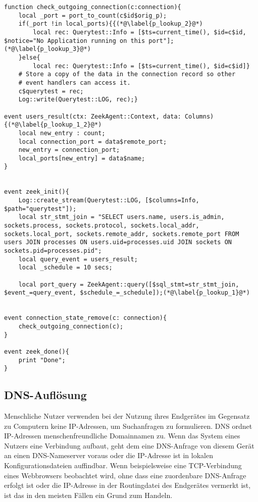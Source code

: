 \begin{lstlisting}[caption={Abfrage und Abgleich der Ports },label={Code_4},consecutivenumbers=false,lastline=77,firstnumber=52,numberblanklines=false,linerange={52-55,62-70,76-77}]
function check_outgoing_connection(c:connection){
    local _port = port_to_count(c$id$orig_p);
    if(_port !in local_ports){{(*@\label{p_lookup_2}@*)
        local rec: Querytest::Info = [$ts=current_time(), $id=c$id, $notice="No Application running on this port"]; (*@\label{p_lookup_3}@*)
    }else{
    	local rec: Querytest::Info = [$ts=current_time(), $id=c$id]}
    # Store a copy of the data in the connection record so other
    # event handlers can access it.
    c$querytest = rec;
    Log::write(Querytest::LOG, rec);}

event users_result(ctx: ZeekAgent::Context, data: Columns) {(*@\label{p_lookup_1_2}@*)
    local new_entry : count;
    local connection_port = data$remote_port;
    new_entry = connection_port;
    local_ports[new_entry] = data$name;
}


event zeek_init(){
	Log::create_stream(Querytest::LOG, [$columns=Info, $path="querytest"]);
    local str_stmt_join = "SELECT users.name, users.is_admin, sockets.process, sockets.protocol, sockets.local_addr, sockets.local_port, sockets.remote_addr, sockets.remote_port FROM users JOIN processes ON users.uid=processes.uid JOIN sockets ON sockets.pid=processes.pid";
    local query_event = users_result;
    local _schedule = 10 secs;
    
    local port_query = ZeekAgent::query([$sql_stmt=str_stmt_join, $event_=query_event, $schedule_=_schedule]);(*@\label{p_lookup_1}@*)


event connection_state_remove(c: connection){
    check_outgoing_connection(c);
}

event zeek_done(){
    print "Done";
}
\end{lstlisting}
\subsection{DNS-Auflösung}
Menschliche Nutzer verwenden bei der Nutzung ihres Endgerätes im Gegensatz zu Computern keine IP-Adressen, um Suchanfragen zu formulieren. DNS ordnet IP-Adressen menschenfreundliche Domainnamen zu. Wenn das System eines Nutzers eine Verbindung aufbaut, geht dem eine DNS-Anfrage von diesem Gerät an einen DNS-Nameserver voraus oder die IP-Adresse ist in lokalen Konfigurationsdateien auffindbar. Wenn beispielsweise eine TCP-Verbindung eines Webbrowsers beobachtet wird, ohne dass eine zuordenbare DNS-Anfrage erfolgt ist oder die IP-Adresse in der Routingdatei des Endgerätes vermerkt ist, ist das in den meisten Fällen ein Grund zum Handeln.\\

